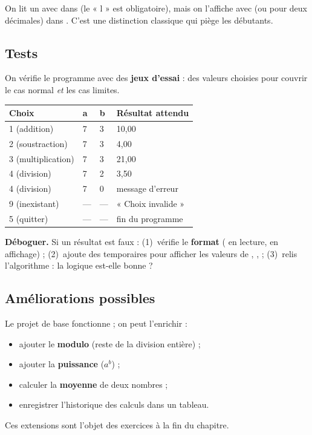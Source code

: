 
\begin{remarque}
On lit un  avec  dans  (le « l » est obligatoire),
mais on l'affiche avec  (ou  pour deux décimales) dans
. C'est une distinction classique qui piège les débutants.
\end{remarque}

\subsection{Tests}

On vérifie le programme avec des \textbf{jeux d'essai} : des valeurs choisies pour
couvrir le cas normal \emph{et} les cas limites.

\begin{center}\small
\begin{tabular}{@{}llll@{}}
\toprule
\textbf{Choix} & \textbf{a} & \textbf{b} & \textbf{Résultat attendu}\\
\midrule
1 (addition) & 7 & 3 & 10,00\\
2 (soustraction) & 7 & 3 & 4,00\\
3 (multiplication) & 7 & 3 & 21,00\\
4 (division) & 7 & 2 & 3,50\\
4 (division) & 7 & 0 & message d'erreur\\
9 (inexistant) & --- & --- & « Choix invalide »\\
5 (quitter) & --- & --- & fin du programme\\
\bottomrule
\end{tabular}
\end{center}

\begin{methode}
\textbf{Déboguer.} Si un résultat est faux : (1)~vérifie le \textbf{format}
( en lecture,  en affichage) ; (2)~ajoute des 
temporaires pour afficher les valeurs de , ,  ;
(3)~relis l'algorithme : la logique est-elle bonne ?
\end{methode}

\subsection{Améliorations possibles}

Le projet de base fonctionne ; on peut l'enrichir :
\begin{itemize}
  \item ajouter le \textbf{modulo} (reste de la division entière) ;
  \item ajouter la \textbf{puissance} ($a^b$) ;
  \item calculer la \textbf{moyenne} de deux nombres ;
  \item enregistrer l'historique des calculs dans un tableau.
\end{itemize}
Ces extensions sont l'objet des exercices à la fin du chapitre.

